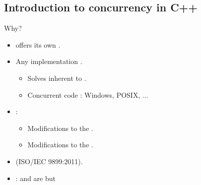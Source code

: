 \subsection{Introduction to concurrency in C++}

\begin{frame}[t]{Why?}
\begin{itemize}
  \item {} offers its own .

  \item Any   implementation .
    \begin{itemize}
      \item Solves  inherent to .
      \item Concurrent code : Windows, POSIX, ...
    \end{itemize}

  \item {}:
    \begin{itemize}
      \item Modifications to the .
      \item Modifications to the .
    \end{itemize}

  \item {}  (ISO/IEC 9899:2011).

  \item {}: 
         and  are
         but 
\end{itemize}
\end{frame}

